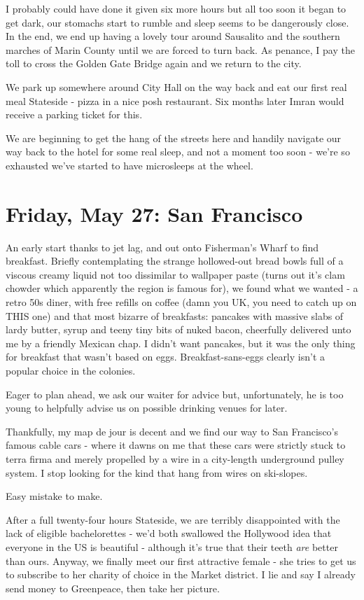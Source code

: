 \documentclass[a5paper,titlepage,11pt,draft]{book}
\begin{document}
I probably could have done it given six more hours but all too soon it began to get dark, our stomachs start to rumble and sleep seems to be dangerously close.  In the end, we end up having a lovely tour around Sausalito and the southern marches of Marin County until we are forced to turn back.  As penance, I pay the toll to cross the Golden Gate Bridge again and we return to the city.

We park up somewhere around City Hall on the way back and eat our first real meal Stateside - pizza in a nice posh restaurant.  Six months later Imran would receive a parking ticket for this.

We are beginning to get the hang of the streets here and handily navigate our way back to the hotel for some real sleep, and not a moment too soon - we're so exhausted we've started to have microsleeps at the wheel.

\chapter[San Francisco]{Friday, May 27: San Francisco}
An early start thanks to jet lag, and out onto Fisherman's Wharf to find breakfast.  Briefly contemplating the strange hollowed-out bread bowls full of a viscous creamy liquid not too dissimilar to wallpaper paste (turns out it's clam chowder which apparently the region is famous for), we found what we wanted - a retro 50s diner, with free refills on coffee (damn you UK, you need to catch up on THIS one) and that most bizarre of breakfasts: pancakes with massive slabs of lardy butter, syrup and teeny tiny bits of nuked bacon, cheerfully delivered unto me by a friendly Mexican chap.  I didn't want pancakes, but it was the only thing for breakfast that wasn't based on eggs.  Breakfast-sans-eggs clearly isn't a popular choice in the colonies.

Eager to plan ahead, we ask our waiter for advice but, unfortunately, he is too young to helpfully advise us on possible drinking venues for later.

Thankfully, my map de jour is decent and we find our way to San Francisco's famous cable cars - where it dawns on me that these cars were strictly stuck to terra firma and merely propelled by a wire in a city-length underground pulley system.  I stop looking for the kind that hang from wires on ski-slopes.

Easy mistake to make.

After a full twenty-four hours Stateside, we are terribly disappointed with the lack of eligible bachelorettes - we'd both swallowed the Hollywood idea that everyone in the US is beautiful - although it's true that their teeth \emph{are} better than ours.  Anyway, we finally meet our first attractive female - she tries to get us to subscribe to her charity of choice in the Market district.  I lie and say I already send money to Greenpeace, then take her picture.
\end{document}
